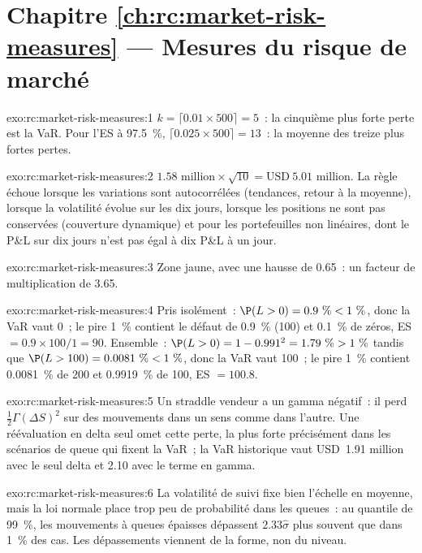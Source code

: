 \section*{Chapitre \ref{ch:rc:market-risk-measures} --- Mesures du risque de marché}

\begin{solution}{exo:rc:market-risk-measures:1}
$k = \lceil0.01\times500\rceil = 5$~: la cinquième plus forte perte est la VaR. Pour l'ES à 97.5~\%,
$\lceil0.025\times500\rceil = 13$~: la moyenne des treize plus fortes pertes.
\end{solution}

\begin{solution}{exo:rc:market-risk-measures:2}
$1.58\text{ million}\times\sqrt{10} = \text{USD}~5.01$ million. La règle échoue lorsque les variations sont
autocorrélées (tendances, retour à la moyenne), lorsque la volatilité évolue sur les dix jours, lorsque les
positions ne sont pas conservées (couverture dynamique) et pour les portefeuilles non linéaires, dont le P\&L sur dix jours
n'est pas égal à dix P\&L à un jour.
\end{solution}

\begin{solution}{exo:rc:market-risk-measures:3}
Zone jaune, avec une hausse de 0.65~: un facteur de multiplication de 3.65.
\end{solution}

\begin{solution}{exo:rc:market-risk-measures:4}
Pris isolément~: $\P(L>0) = 0.9~\% < 1~\%$, donc la VaR vaut 0~; le pire 1~\% contient le défaut de 0.9~\% (100) et 0.1~\%
de zéros, ES $= 0.9\times100/1 = 90$. Ensemble~: $\P(L>0) = 1-0.991^2 = 1.79~\% > 1~\%$ tandis que $\P(L>100) =
0.0081~\% < 1~\%$, donc la VaR vaut 100~; le pire 1~\% contient 0.0081~\% de 200 et 0.9919~\% de 100, ES $= 100.8$.
\end{solution}

\begin{solution}{exo:rc:market-risk-measures:5}
Un straddle vendeur a un gamma négatif~: il perd $\tfrac12\Gamma(\Delta S)^2$ sur des mouvements
dans un sens comme dans l'autre. Une réévaluation en delta seul omet cette perte, la plus forte
précisément dans les scénarios de queue qui fixent la VaR~; la VaR historique vaut USD~1.91 million avec le seul delta et 2.10 avec le
terme en gamma.
\end{solution}

\begin{solution}{exo:rc:market-risk-measures:6}
La volatilité de suivi fixe bien l'échelle en moyenne, mais la loi normale place trop
peu de probabilité dans les queues~: au quantile de 99~\%, les mouvements à queues épaisses dépassent $2.33\hat\sigma$ plus
souvent que dans 1~\% des cas. Les dépassements viennent de la forme, non du niveau.
\end{solution}


